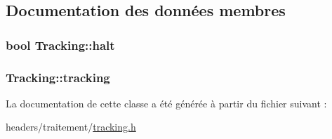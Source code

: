 \subsection{Documentation des données membres}
\hypertarget{classTracking_a48f10566a108662402396857d9c33e6b}{
\subsubsection[{halt}]{\setlength{\rightskip}{0pt plus 5cm}bool Tracking\-::halt\hspace{0.3cm}{\ttfamily [private]}}}\label{classTracking_a48f10566a108662402396857d9c33e6b}
\hypertarget{classTracking_a3eba07f069b521e4ea79c9c7e7933af0}{
\subsubsection[{tracking}]{ Tracking\-::tracking\hspace{0.3cm}{\ttfamily [private]}}}\label{classTracking_a3eba07f069b521e4ea79c9c7e7933af0}


La documentation de cette classe a été générée à partir du fichier suivant \-:\begin{DoxyCompactItemize}
\item 
headers/traitement/\hyperlink{tracking_8h}{tracking.\-h}\end{DoxyCompactItemize}
